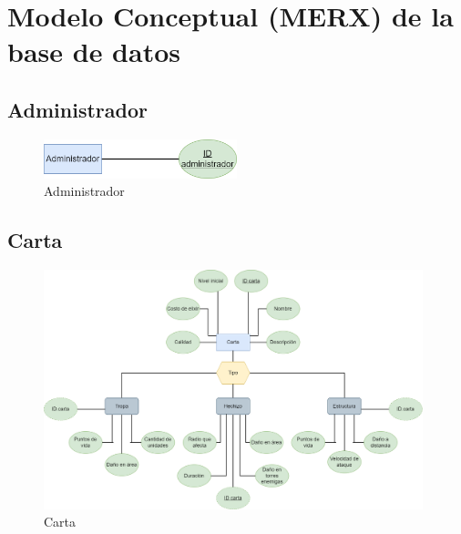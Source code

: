 %
%
%
%
\section{Modelo Conceptual (MERX) de la base de datos}

\subsection*{Administrador}
\begin{figure}[H]
\centering
\includegraphics[width=0.5\textwidth]{../images/merx_administrator.png}
\caption{Administrador}
\end{figure}

\subsection*{Carta}
\begin{figure}[H]
\centering
\includegraphics[width=0.98\textwidth]{../images/merx_card.png}
\caption{Carta}
\end{figure}

